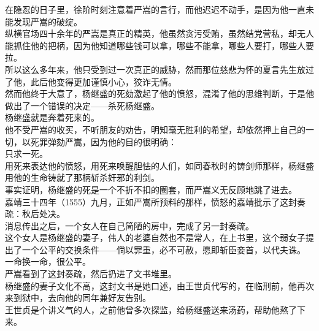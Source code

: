 \begin{multicols}{\theparacolNo}
在隐忍的日子里，徐阶时刻注意着严嵩的言行，而他迟迟不动手，是因为他一直未能发现严嵩的破绽。\\

纵横官场四十余年的严嵩是真正的精英，他虽然贪污受贿，虽然结党营私，却无人能抓住他的把柄，因为他知道哪些钱可以拿，哪些不能拿，哪些人要打，哪些人要拉。\\

所以这么多年来，他只受到过一次真正的威胁，然而那位慈悲为怀的夏言先生放过了他，此后他变得更加谨慎小心，狡诈无情。\\

然而他终于大意了，杨继盛的死劾激起了他的愤怒，混淆了他的思维判断，于是他做出了一个错误的决定——杀死杨继盛。\\

杨继盛就是奔着死来的。\\

他不受严嵩的收买，不听朋友的劝告，明知毫无胜利的希望，却依然押上自己的一切，以死罪弹劾严嵩，因为他的目的很明确：\\

只求一死。\\

用死来表达他的愤怒，用死来唤醒胆怯的人们，如同春秋时的铸剑师那样，杨继盛用他的生命铸就了那柄斩杀奸邪的利剑。\\

事实证明，杨继盛的死是一个不折不扣的圈套，而严嵩义无反顾地跳了进去。\\

嘉靖三十四年（1555）九月，正如严嵩所预料的那样，愤怒的嘉靖批示了这封奏疏：秋后处决。\\

消息传出之后，一个女人在自己简陋的房中，完成了另一封奏疏。\\

这个女人是杨继盛的妻子，伟人的老婆自然也不是常人，在上书里，这个弱女子提出了一个公平的交换条件——倘以罪重，必不可赦，愿即斩臣妾首，以代夫诛。\\

一命换一命，很公平。\\

严嵩看到了这封奏疏，然后扔进了文书堆里。\\

杨继盛的妻子文化不高，这封文书是她口述，由王世贞代写的，在临刑前，他再次来到狱中，去向他的同年兼好友告别。\\

王世贞是个讲义气的人，之前他曾多次探监，给杨继盛送来汤药，帮助他熬了下来。\\


\end{multicols}

